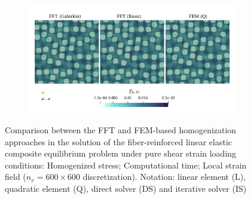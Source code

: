 \begin{figure}[hbt]
\begin{subfigure}[b]{0.49\textwidth}
    \caption{}
    \label{subfig:linear_2D_shear_cpu_time_vs_n_voxels}
  \end{subfigure}
  \begin{subfigure}[b]{\textwidth}
    \centering
    \includegraphics[width=\textwidth]{figures/linear_2D_shear_strain_12}
    \caption{}
    \label{subfig:linear_2D_shear_strain_12}
  \end{subfigure}
  \caption{Comparison between the FFT and FEM-based homogenization approaches in the
  solution of the fiber-reinforced linear elastic composite equilibrium problem under pure
  shear strain loading conditions:
   Homogenized stress;
   Computational time;
   Local strain field (\(n_v = 600 \times 600\)
  discretization). Notation: linear element (L), quadratic element (Q), direct solver (DS)
  and iterative solver (IS)}
\label{fig:linear_2D_shear}
\end{figure}

